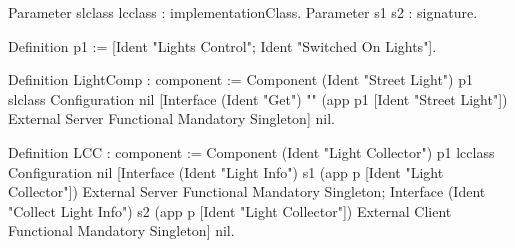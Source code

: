 Parameter slclass lcclass : implementationClass.
Parameter s1 s2 : signature.

Definition p1 := [Ident "Lights Control"; Ident "Switched On Lights"].

Definition LightComp : component :=
  Component (Ident "Street Light") p1 slclass Configuration nil 
      [Interface (Ident "Get") "" (app p1 [Ident "Street Light"]) 
             External Server Functional Mandatory Singleton] nil.

Definition LCC : component := 
 Component (Ident "Light Collector") p1 lcclass Configuration nil 
     [Interface (Ident "Light Info") s1 (app p [Ident "Light Collector"]) 
            External Server Functional Mandatory Singleton;
      Interface (Ident "Collect Light Info") s2 (app p [Ident "Light Collector"]) 
            External Client Functional Mandatory Singleton] 
     nil.
